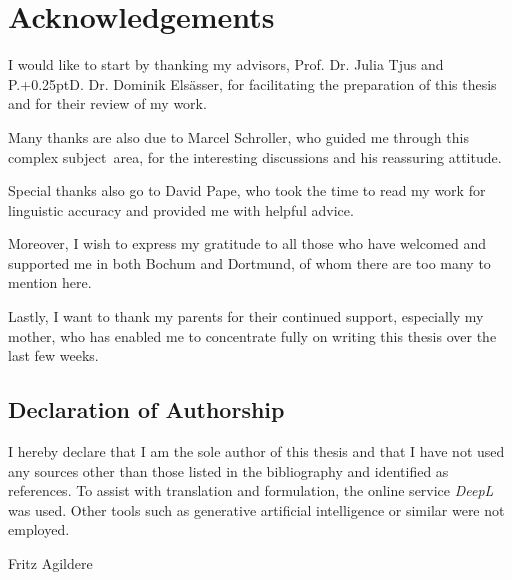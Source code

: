 \chapter*{Acknowledgements}
\label{ch:acknowledgements}

I would like to start by thanking my advisors, Prof. Dr. Julia Tjus and P{\kern-0.25pt}.{\kern+0.25pt}D. Dr. Dominik Elsässer,
for facilitating the preparation of this thesis and for their review of my work.

Many thanks are also due to Marcel Schroller, who guided me through this complex subject~area,
for the interesting discussions and his reassuring attitude.

Special thanks also go to David Pape, who took the time to read my work for linguistic
accuracy and provided me with helpful advice.

Moreover, I wish to express my gratitude to all those who have welcomed and supported me in
both Bochum and Dortmund, of whom there are too many to mention here.

Lastly, I want to thank my parents for their continued support, especially my mother,
who has enabled me to concentrate fully on writing this thesis over the last few weeks.

\vfill

\section*{Declaration of Authorship}

I hereby declare that I am the sole author of this thesis and that I have not used
any sources other than those listed in the bibliography and identified as references.
To assist with translation and formulation, the online service \emph{DeepL} was used.
Other tools such as generative artificial intelligence or similar were not employed.

Fritz Agildere

